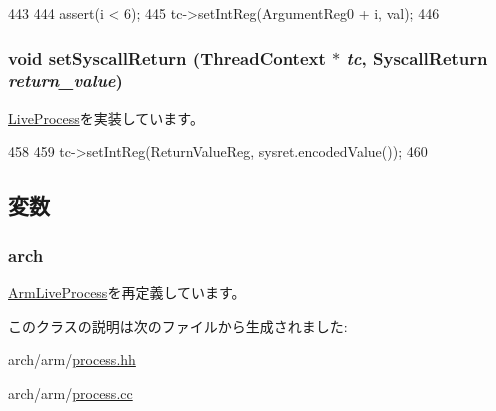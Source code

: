 \begin{DoxyCode}
443 {
444     assert(i < 6);
445     tc->setIntReg(ArgumentReg0 + i, val);
446 }
\end{DoxyCode}
\hypertarget{classArmLiveProcess32_aaefd02663c1eae206b851290d9276a5e}{
\subsubsection[{setSyscallReturn}]{\setlength{\rightskip}{0pt plus 5cm}void setSyscallReturn ({\bf ThreadContext} $\ast$ {\em tc}, \/  {\bf SyscallReturn} {\em return\_\-value})}}
\label{classArmLiveProcess32_aaefd02663c1eae206b851290d9276a5e}


\hyperlink{classLiveProcess_a5955e790542b86589b9fd75df24ec2d3}{LiveProcess}を実装しています。


\begin{DoxyCode}
458 {
459     tc->setIntReg(ReturnValueReg, sysret.encodedValue());
460 }
\end{DoxyCode}


\subsection{変数}
\hypertarget{classArmLiveProcess32_abf93aa1dd69df35e2a50f63d5a5d4c40}{
\subsubsection[{arch}]{ {\bf arch}}}
\label{classArmLiveProcess32_abf93aa1dd69df35e2a50f63d5a5d4c40}


\hyperlink{classArmLiveProcess_abf93aa1dd69df35e2a50f63d5a5d4c40}{ArmLiveProcess}を再定義しています。

このクラスの説明は次のファイルから生成されました:\begin{DoxyCompactItemize}
\item 
arch/arm/\hyperlink{arch_2arm_2process_8hh}{process.hh}\item 
arch/arm/\hyperlink{arch_2arm_2process_8cc}{process.cc}\end{DoxyCompactItemize}
